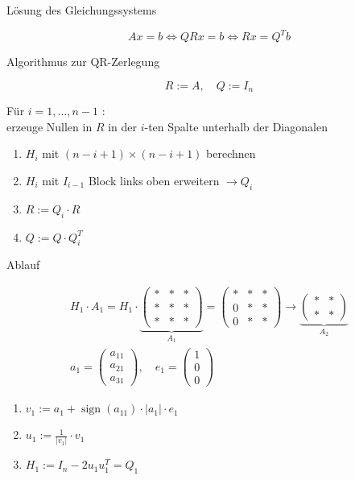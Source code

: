 Lösung des Gleichungssystems

$$
A x=b \Leftrightarrow Q R x=b \Leftrightarrow R x=Q^{T} b
$$

Algorithmus zur QR-Zerlegung

$$
R:=A, \quad Q:=I_{n}
$$

Für $i=1, \ldots, n-1$ :\\
erzeuge Nullen in $R$ in der $i$-ten Spalte unterhalb der Diagonalen

\begin{enumerate}
  \item $H_{i}$ mit $(n-i+1) \times(n-i+1)$ berechnen
  \item $H_{i}$ mit $I_{i-1}$ Block links oben erweitern $\rightarrow Q_{i}$
  \item $R:=Q_{i} \cdot R$
  \item $Q:=Q \cdot Q_{i}^{T}$
\end{enumerate}

Ablauf

$$
\begin{gathered}
H_{1} \cdot A_{1}=H_{1} \cdot \underbrace{\left(\begin{array}{lll}
* & * & * \\
* & * & * \\
* & * & *
\end{array}\right)}_{A_{1}}=\left(\begin{array}{lll}
* & * & * \\
0 & * & * \\
0 & * & *
\end{array}\right) \rightarrow \underbrace{\left(\begin{array}{cc}
* & * \\
* & *
\end{array}\right)}_{A_{2}} \\
a_{1}=\left(\begin{array}{l}
a_{11} \\
a_{21} \\
a_{31}
\end{array}\right), \quad e_{1}=\left(\begin{array}{l}
1 \\
0 \\
0
\end{array}\right)
\end{gathered}
$$

\begin{enumerate}
  \item $v_{1}:=a_{1}+\operatorname{sign}\left(a_{11}\right) \cdot\left|a_{1}\right| \cdot e_{1}$
  \item $u_{1}:=\frac{1}{\left|v_{1}\right|} \cdot v_{1}$
  \item $H_{1}:=I_{n}-2 u_{1} u_{1}^{T}=Q_{1}$
\end{enumerate}

